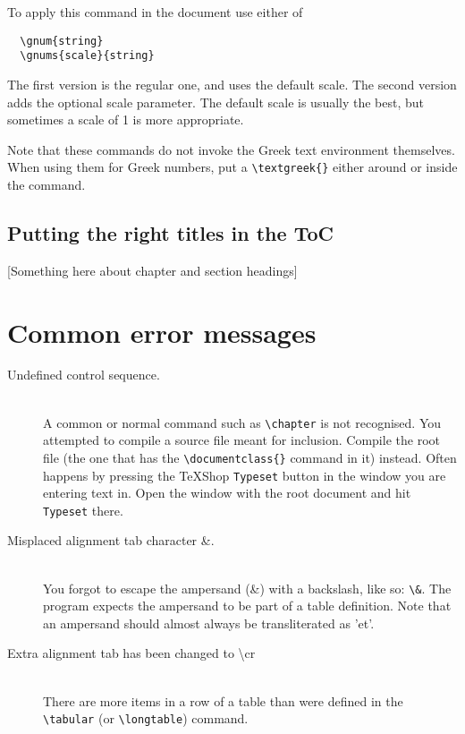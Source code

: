 \documentclass{report}
\begin{document}
To apply this command in the document use either of
\begin{verbatim}
  \gnum{string}
  \gnums{scale}{string}
\end{verbatim}
The first version is the regular one, and uses the default scale.
The second version adds the optional scale parameter.
The default scale is usually the best, but
sometimes a scale of 1 is more appropriate.

Note that these commands do not invoke the Greek text environment themselves.
When using them for Greek numbers, put a \verb+\textgreek{}+ either
around or inside the command.


\subsection{Putting the right titles in the ToC}
[Something here about chapter and section headings]

\section{Common error messages}
\begin{description}
\item[Undefined control sequence.] \hfill \\
A common or normal command such as \verb;\chapter;
is not recognised.
You attempted to compile a source file meant for inclusion.
Compile the root file (the one that has the \verb;\documentclass{}; command
in it) instead.
Often happens by pressing the TeXShop \texttt{Typeset} button in the window
you are entering text in.
Open the window with the root document and hit \texttt{Typeset} there.

\item[Misplaced alignment tab character \&.] \hfill \\
You forgot to escape the ampersand (\&) with a backslash, like so: \verb;\&;.
The program expects the ampersand to be part of a table definition.
Note that an ampersand should almost always be transliterated as 'et'.

\item[Extra alignment tab has been changed to \textbackslash{}cr] \hfill \\
There are more items in a row of a table than were defined in the
\verb+\tabular+ (or \verb+\longtable+) command.

\end{description}
\end{document}
